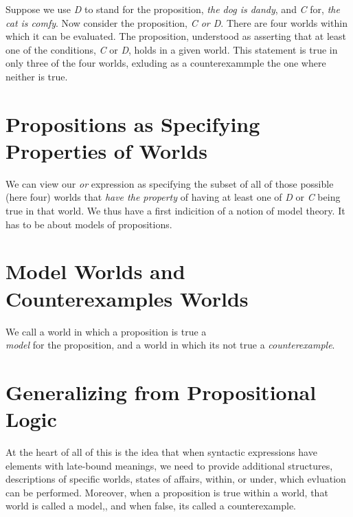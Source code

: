 \documentclass{book}
\begin{document}
Suppose we use \emph{D} to stand for the proposition,
\emph{the dog is dandy}, and \emph{C} for, \emph{the cat is comfy}.
Now consider the proposition, \emph{C or D}. There are
four worlds within which it can be evaluated. The
proposition, understood as asserting that at least
one of the conditions, \emph{C} or \emph{D}, holds in a given
world. This statement is true in only three of the
four worlds, exluding as a counterexammple the one
where neither is true.

\hypertarget{book__pandoc__debug__src__modeltheory.md__propositions-as-specifying-properties-of-worlds}{%
\section*{Propositions as Specifying Properties of Worlds}\label{book__pandoc__debug__src__modeltheory.md__propositions-as-specifying-properties-of-worlds}}

We can view our \emph{or} expression as specifying the
subset of all of those possible (here four) worlds
that \emph{have the property} of having at least one of
\emph{D} or \emph{C} being true in that world. We thus have a
first indicition of a notion of model theory. It has
to be about models of propositions.

\hypertarget{book__pandoc__debug__src__modeltheory.md__model-worlds-and-counterexamples-worlds}{%
\section*{Model Worlds and Counterexamples Worlds}\label{book__pandoc__debug__src__modeltheory.md__model-worlds-and-counterexamples-worlds}}

We call a world in which a proposition is true a\\
\emph{model} for the proposition, and a world in which
it\textquotesingle s not true a \emph{counterexample}.

\hypertarget{book__pandoc__debug__src__modeltheory.md__generalizing-from-propositional-logic}{%
\section*{Generalizing from Propositional Logic}\label{book__pandoc__debug__src__modeltheory.md__generalizing-from-propositional-logic}}

At the heart of all of this is the idea that when
syntactic expressions have elements with late-bound
meanings, we need to provide additional structures,
descriptions of specific worlds, states of affairs,
within, or under, which evluation can be performed.
Moreover, when a proposition is true within a world,
that world is called a model,, and when false, it\textquotesingle s
called a counterexample.
\end{document}
